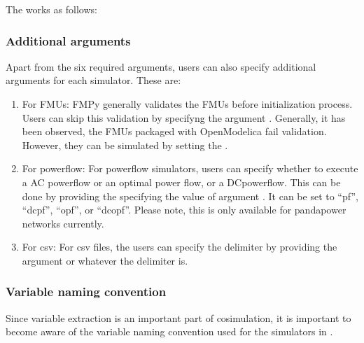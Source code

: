 \documentclass[letterpaper,10pt,english]{sphinxmanual}
\begin{document}
The  works as follows:

\begin{sphinxVerbatim}[commandchars=\\\{\}]
     
                            
                          
\end{sphinxVerbatim}


\subsubsection{Additional arguments}
\label{\detokenize{add_simulator:additional-arguments}}
Apart from the six required arguments, users can also specify additional arguments for each simulator. These are:
\begin{enumerate}
%
\item {} 
For FMUs: FMPy generally validates the FMUs before initialization process. Users can skip this validation by specifyng the argument . Generally, it has been observed, the FMUs packaged with OpenModelica fail validation. However, they can be simulated by setting the .

\item {} 
For powerflow: For powerflow simulators, users can specify whether to execute a AC powerflow or an optimal power flow, or a DCpowerflow. This can be done by providing the specifying the value of argument . It can be set to “pf”, “dcpf”, “opf”, or “dcopf”. Please note, this is only available for pandapower networks currently.

\item {} 
For csv: For csv files, the users can specify the delimiter by providing the argument  or whatever the delimiter is.

\end{enumerate}


\subsubsection{Variable naming convention}
\label{\detokenize{add_simulator:variable-naming-convention}}
Since variable extraction is an important part of cosimulation, it is important to become aware of the variable naming convention used for the simulators in .
\end{document}
